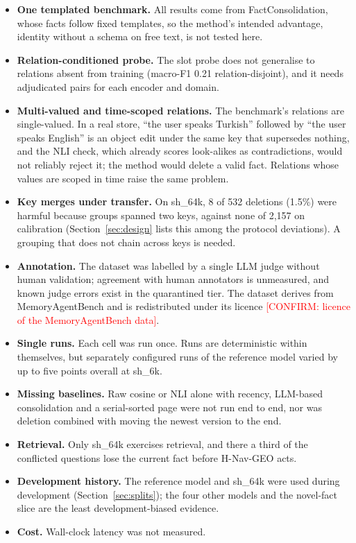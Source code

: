 \documentclass[11pt]{article}
\newcommand{\sub}[1]{\textsf{sh\_#1}}                    %
\newcommand{\geo}{H-Nav-GEO}
\newcommand{\confirm}[1]{\textcolor{red}{[CONFIRM: #1]}} %
\begin{document}
\begin{itemize}
\item \textbf{One templated benchmark.} All results come from FactConsolidation, whose facts follow fixed templates, so the method's intended advantage, identity without a schema on free text, is not tested here.
\item \textbf{Relation-conditioned probe.} The slot probe does not generalise to relations absent from training (macro-F1 0.21 relation-disjoint), and it needs adjudicated pairs for each encoder and domain.
\item \textbf{Multi-valued and time-scoped relations.} The benchmark's relations are single-valued. In a real store, ``the user speaks Turkish'' followed by ``the user speaks English'' is an object edit under the same key that supersedes nothing, and the NLI check, which already scores look-alikes as contradictions, would not reliably reject it; the method would delete a valid fact. Relations whose values are scoped in time raise the same problem.
\item \textbf{Key merges under transfer.} On \sub{64k}, 8 of 532 deletions (1.5\%) were harmful because groups spanned two keys, against none of 2,157 on calibration (Section~\ref{sec:design} lists this among the protocol deviations). A grouping that does not chain across keys is needed.
\item \textbf{Annotation.} The dataset was labelled by a single LLM judge without human validation; agreement with human annotators is unmeasured, and known judge errors exist in the quarantined tier. The dataset derives from MemoryAgentBench and is redistributed under its licence \confirm{licence of the MemoryAgentBench data}.
\item \textbf{Single runs.} Each cell was run once. Runs are deterministic within themselves, but separately configured runs of the reference model varied by up to five points overall at \sub{6k}.
\item \textbf{Missing baselines.} Raw cosine or NLI alone with recency, LLM-based consolidation and a serial-sorted page were not run end to end, nor was deletion combined with moving the newest version to the end.
\item \textbf{Retrieval.} Only \sub{64k} exercises retrieval, and there a third of the conflicted questions lose the current fact before \geo{} acts.
\item \textbf{Development history.} The reference model and \sub{64k} were used during development (Section~\ref{sec:splits}); the four other models and the novel-fact slice are the least development-biased evidence.
\item \textbf{Cost.} Wall-clock latency was not measured.
\end{itemize}
\end{document}
